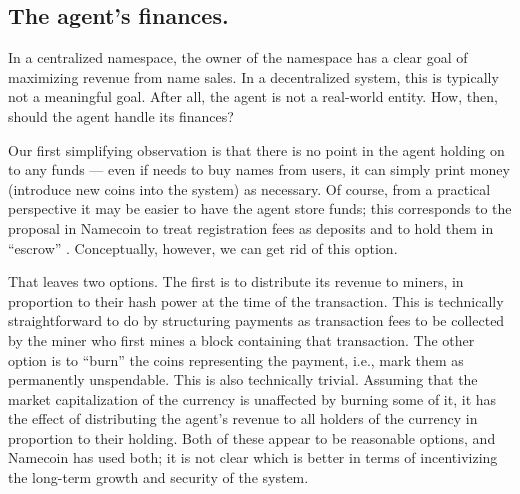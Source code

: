 \subsection{The agent's finances.}
In a centralized namespace, the owner of the namespace has a clear goal of maximizing revenue from name sales. In a decentralized system, this is typically not a meaningful goal. After all, the agent is not a real-world entity.  How, then, should the agent handle its finances? 

Our first simplifying observation is that there is no point in the agent holding on to any funds --- even if needs to buy names from users, it can simply print money (introduce new coins into the system) as necessary. Of course, from a practical perspective it may be easier to have the agent store funds; this corresponds to the proposal in Namecoin to treat registration fees as deposits and to hold them in ``escrow'' \cite{}. Conceptually, however, we can get rid of this option.

That leaves two options. The first is to distribute its revenue to miners, in proportion to their hash power at the time of the transaction. This is technically straightforward to do by structuring payments as transaction fees to be collected by the miner who first mines a block containing that transaction. The other option is to ``burn'' the coins representing the payment, i.e., mark them as permanently unspendable. This is also technically trivial. Assuming that the market capitalization of the currency is unaffected by burning some of it, it has the effect of distributing the agent's revenue to all holders of the currency in proportion to their holding. Both of these appear to be reasonable options, and Namecoin has used both; it is not clear which is better in terms of incentivizing the long-term growth and security of the system.


